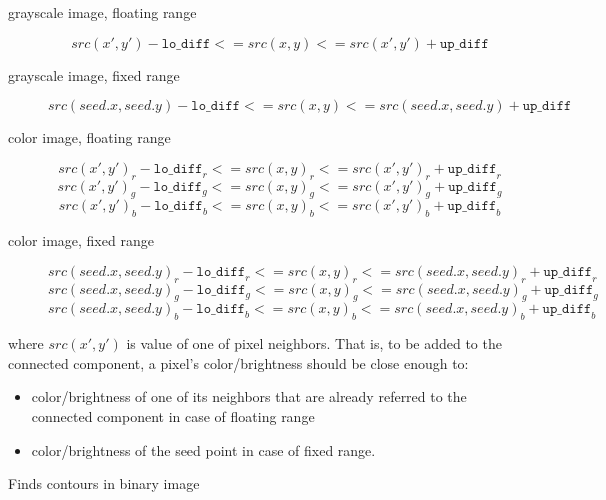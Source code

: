 \begin{description}

\item[grayscale image, floating range] \[
src(x',y')-\texttt{lo\_diff} <= src(x,y) <= src(x',y')+\texttt{up\_diff} \]

\item[grayscale image, fixed range] \[
src(seed.x,seed.y)-\texttt{lo\_diff}<=src(x,y)<=src(seed.x,seed.y)+\texttt{up\_diff} \]

\item[color image, floating range]
\[ src(x',y')_r-\texttt{lo\_diff}_r<=src(x,y)_r<=src(x',y')_r+\texttt{up\_diff}_r \]
\[ src(x',y')_g-\texttt{lo\_diff}_g<=src(x,y)_g<=src(x',y')_g+\texttt{up\_diff}_g \]
\[ src(x',y')_b-\texttt{lo\_diff}_b<=src(x,y)_b<=src(x',y')_b+\texttt{up\_diff}_b \]

\item[color image, fixed range]
\[ src(seed.x,seed.y)_r-\texttt{lo\_diff}_r<=src(x,y)_r<=src(seed.x,seed.y)_r+\texttt{up\_diff}_r \]
\[ src(seed.x,seed.y)_g-\texttt{lo\_diff}_g<=src(x,y)_g<=src(seed.x,seed.y)_g+\texttt{up\_diff}_g \]
\[ src(seed.x,seed.y)_b-\texttt{lo\_diff}_b<=src(x,y)_b<=src(seed.x,seed.y)_b+\texttt{up\_diff}_b \]
\end{description}

where $src(x',y')$ is value of one of pixel neighbors. That is, to be added to the connected component, a pixel's color/brightness should be close enough to:
\begin{itemize}
  \item color/brightness of one of its neighbors that are already referred to the connected component in case of floating range
  \item color/brightness of the seed point in case of fixed range.
\end{itemize}

\label{FindContours}

Finds contours in binary image



